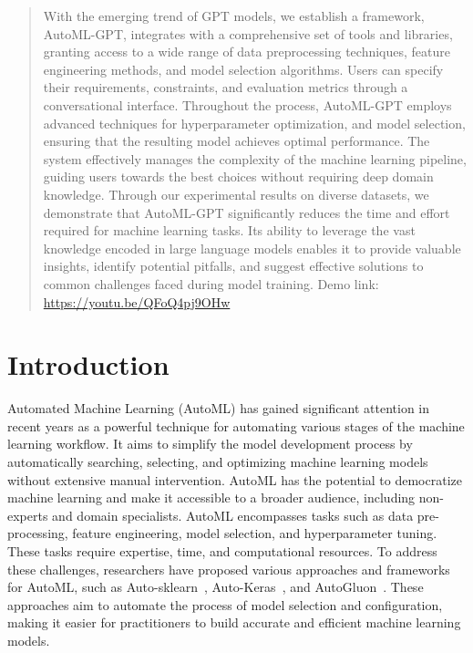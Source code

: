 \documentclass{article}
\theoremstyle{plain}
\theoremstyle{definition}
\theoremstyle{remark}
\begin{document}
\printAffiliationsAndNotice{}  %

\begin{abstract}
With the emerging trend of GPT models, we establish a framework, AutoML-GPT, integrates with a comprehensive set of tools and libraries, granting access to a wide range of data preprocessing techniques, feature engineering methods, and model selection algorithms. Users can specify their requirements, constraints, and evaluation metrics through a conversational interface.
Throughout the process, AutoML-GPT employs advanced techniques for hyperparameter optimization, and model selection, ensuring that the resulting model achieves optimal performance. The system effectively manages the complexity of the machine learning pipeline, guiding users towards the best choices without requiring deep domain knowledge.
Through our experimental results on diverse datasets, we demonstrate that AutoML-GPT significantly reduces the time and effort required for machine learning tasks. Its ability to leverage the vast knowledge encoded in large language models enables it to provide valuable insights, identify potential pitfalls, and suggest effective solutions to common challenges faced during model training. Demo link: \url{https://youtu.be/QFoQ4pj9OHw}
\end{abstract}

\section{Introduction}
Automated Machine Learning (AutoML) has gained significant attention in recent years as a powerful technique for automating various stages of the machine learning workflow. It aims to simplify the model development process by automatically searching, selecting, and optimizing machine learning models without extensive manual intervention. AutoML has the potential to democratize machine learning and make it accessible to a broader audience, including non-experts and domain specialists.
AutoML encompasses tasks such as data pre-processing, feature engineering, model selection, and hyperparameter tuning. These tasks require expertise, time, and computational resources. To address these challenges, researchers have proposed various approaches and frameworks for AutoML, such as Auto-sklearn~\cite{autosklearn}, Auto-Keras~\cite{autokeras}, and AutoGluon~\cite{autoGluon}. These approaches aim to automate the process of model selection and configuration, making it easier for practitioners to build accurate and efficient machine learning models.
\end{document}
